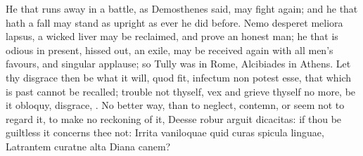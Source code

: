 {He that runs away in a battle, as Demosthenes said, may fight again;
and he that hath a fall may stand as upright as ever he did before.
Nemo desperet meliora lapsus, a wicked liver may be reclaimed, and
prove an honest man; he that is odious in present, hissed out, an
exile, may be received again with all men's favours, and singular
applause; so Tully was in Rome, Alcibiades in Athens. Let thy disgrace
then be what it will, quod fit, infectum non potest esse, that which is
past cannot be recalled; trouble not thyself, vex and grieve thyself no
more, be it obloquy, disgrace, \etc{}. No better way, than to neglect,
contemn, or seem not to regard it, to make no reckoning of it, Deesse
robur arguit dicacitas: if thou be guiltless it concerns thee not:
Irrita vaniloquae quid curas spicula linguae,
Latrantem curatne alta Diana canem?

}
